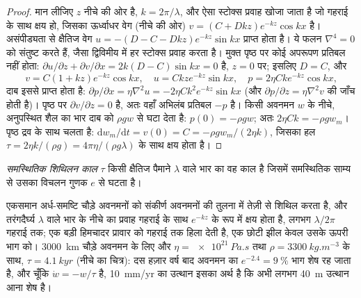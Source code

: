 \begin{proof}
मान लीजिए $z$ नीचे की ओर है, $k = 2\pi/\lambda$, और ऐसा स्टोक्स प्रवाह खोजा जाता है जो
गहराई के साथ क्षय हो, जिसका ऊर्ध्वाधर वेग (नीचे की ओर) $v = (C + Dkz)e^{-kz}\cos kx$ है।
असंपीड्यता से क्षैतिज वेग $u = -(D - C - Dkz)e^{-kz}\sin
kx$ प्राप्त होता है। ये फलन $\nabla^4 = 0$ को संतुष्ट करते हैं, जैसा
द्विविमीय में हर स्टोक्स प्रवाह करता है। मुक्त पृष्ठ पर कोई अपरूपण प्रतिबल नहीं होता: $\partial u/\partial
z + \partial v/\partial x = 2k(D - C)\sin kx = 0$ है, $z = 0$ पर; इसलिए $D = C$, और
\[
  v = C(1 + kz)e^{-kz}\cos kx,\quad u = Ckze^{-kz}\sin kx,\quad
  p = 2\eta Cke^{-kz}\cos kx,
\]
दाब इससे प्राप्त होता है: $\partial p/\partial x = \eta\nabla^2u = -2\eta
Ck^2e^{-kz}\sin kx$ (और $\partial p/\partial z = \eta\nabla^2v$ की जाँच होती है)। पृष्ठ पर
$\partial v/\partial z = 0$ है, अतः वहाँ अभिलंब प्रतिबल $-p$ है। किसी अवनमन $w$
के नीचे, अनुपस्थित शैल का भार दाब को $\rho
gw$ से घटा देता है: $p(0) = -\rho gw$; अतः $2\eta Ck = -\rho gw_m$। पृष्ठ
द्रव के साथ चलता है: $\mathrm dw_m/\mathrm dt = v(0) = C = -\rho gw_m/(2\eta k)$, जिसका
हल $\tau = 2\eta k/(\rho g) = 4\pi\eta/(\rho g\lambda)$ के साथ क्षय होता है।
\end{proof}

\begin{definition}[समस्थितिक शिथिलन काल]\label{def:b3:mantle-convection:relaxation-time}
\emph{समस्थितिक शिथिलन काल} $\tau$ किसी
क्षैतिज पैमाने $\lambda$ वाले भार का वह काल है जिसमें समस्थितिक साम्य से उसका विचलन
गुणक $e$ से घटता है।
\end{definition}

एकसमान अर्ध-समष्टि चौड़े अवनमनों को संकीर्ण अवनमनों की तुलना में तेज़ी से शिथिल करता है, और
तरंगदैर्घ्य $\lambda$ वाले भार के नीचे का प्रवाह गहराई के साथ $e^{-kz}$ के रूप में क्षय होता है, लगभग
$\lambda/2\pi$ गहराई तक; एक बड़ी हिमचादर प्रावार को गहराई तक हिला देती है, एक छोटी झील
केवल उसके ऊपरी भाग को। \qty{3000}{km} चौड़े अवनमन के लिए और $\eta =
\qty{e21}{Pa.s}$ तथा $\rho = \qty{3300}{kg.m^{-3}}$ के साथ, $\tau = \qty{4.1}{kyr}$
(नीचे का चित्र): दस हज़ार वर्ष बाद अवनमन का $e^{-2.4} = \qty{9}{\percent}$ भाग
शेष रह जाता है, और चूँकि $\dot w = -w/\tau$ है, \qty{10}{mm/yr} का उत्थान
इसका अर्थ है कि अभी लगभग \qty{40}{m} उत्थान आना शेष है।

